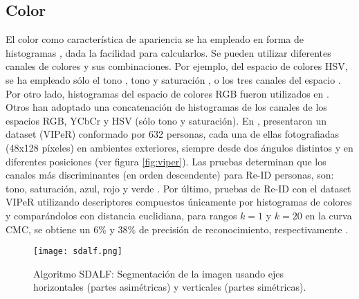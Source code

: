 \documentclass[../memoria.tex]{subfiles}
\begin{document}
\subsection{Color}
\indent El color como característica de apariencia se ha empleado en forma de histogramas \cite{gheissari2006person, gray2008viewpoint, javed2008modeling, oliveira2009people, farenzena2010person, prosser2010person, zheng2011person}, dada la facilidad para calcularlos. Se pueden utilizar diferentes canales de colores y sus combinaciones. Por ejemplo, del espacio de colores HSV, se ha empleado sólo el tono \cite{oliveira2009people},  tono y saturación \cite{gheissari2006person}, o los tres canales del espacio \cite{farenzena2010person}. Por otro lado, histogramas del espacio de colores RGB fueron utilizados en \cite{prosserxiang2008multi, javed2008modeling, berdugo2010object}. Otros\cite{gray2008viewpoint, prosser2010person, zheng2011person} han adoptado una concatenación de histogramas de los canales de los espacios RGB, YCbCr y HSV (sólo tono y saturación). En \cite{gray2008viewpoint}, presentaron un dataset (VIPeR) conformado por 632 personas, cada una de ellas fotografiadas (48x128 píxeles) en ambientes exteriores, siempre desde dos ángulos distintos y en diferentes posiciones (ver figura \ref{fig:viper}). Las pruebas determinan que los canales más discriminantes (en orden descendente) para Re-ID personas, son: tono, saturación, azul, rojo y verde \cite{mazzon2012person}. Por último, pruebas de Re-ID con el dataset VIPeR utilizando descriptores compuestos únicamente por histogramas de colores y comparándolos con distancia euclidiana, para rangos $k=1$ y $k=20$ en la curva CMC, se obtiene un 6\% y 38\% de precisión de reconocimiento, respectivamente \cite{hirzer2012relaxed}.


\begin{figure}
  \centering
  \texttt{[image: sdalf.png]}
  \caption{Algoritmo SDALF: Segmentación de la imagen usando ejes horizontales (partes asimétricas) y verticales (partes simétricas).}
  \label{fig:sdalf}
\end{figure}
\end{document}
